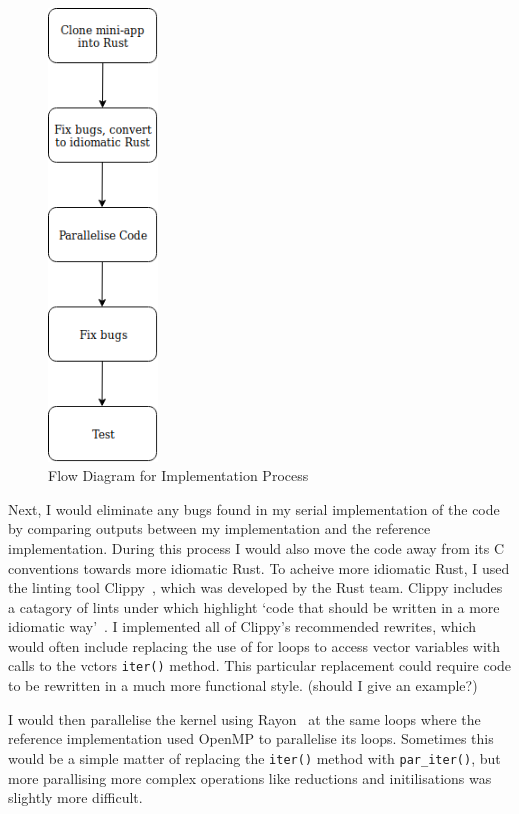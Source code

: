 \begin{figure}
  \center
  \includegraphics[height=12cm]{figs/ImplementationFlow.png}
  \caption{Flow Diagram for Implementation Process}
  \label{fig:imp-flow}
\end{figure}

Next, I would eliminate any bugs found in my serial implementation of the code by comparing outputs between my implementation and the reference implementation. During this process I would also move the code away from its C conventions towards more idiomatic Rust. To acheive more idiomatic Rust, I used the linting tool Clippy~\cite{RustClippy}, which was developed by the Rust team.  Clippy includes a catagory of lints under  which highlight `code that should be written in a more idiomatic way'~\cite{RustClippy}. I implemented all of Clippy's recommended rewrites, which would often include replacing the use of for loops to access vector variables with calls to the vctors \texttt{iter()} method. This particular replacement could require code to be rewritten in a much more functional style. (should I give an example?)

I would then parallelise the kernel using Rayon~\cite{RustRayon} at the same loops where the reference implementation used OpenMP to parallelise its loops. Sometimes this would be a simple matter of replacing the \texttt{iter()} method with \texttt{par_iter()}, but more parallising more complex operations like reductions and initilisations was slightly more difficult.

